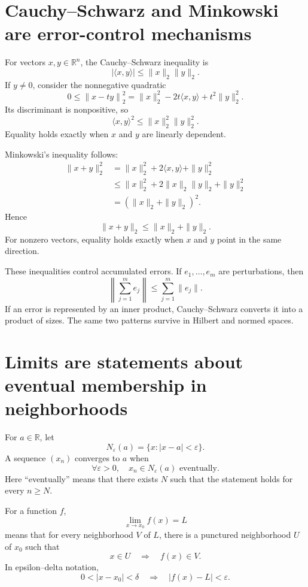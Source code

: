 
\section{Cauchy--Schwarz and Minkowski are error-control mechanisms}

For vectors \(x,y\in\mathbb R^n\), the Cauchy--Schwarz inequality is
\[
  |\langle x,y\rangle|
  \le \|x\|_2\|y\|_2.
\]
If \(y\ne0\), consider the nonnegative quadratic
\[
  0\le
  \left\|x-t y\right\|_2^2
  =\|x\|_2^2-2t\langle x,y\rangle+t^2\|y\|_2^2.
\]
Its discriminant is nonpositive, so
\[
  \langle x,y\rangle^2
  \le \|x\|_2^2\|y\|_2^2.
\]
Equality holds exactly when \(x\) and \(y\) are linearly dependent.

Minkowski's inequality follows:
\[
\begin{aligned}
  \|x+y\|_2^2
  &=\|x\|_2^2+2\langle x,y\rangle+\|y\|_2^2\\
  &\le\|x\|_2^2+2\|x\|_2\|y\|_2+\|y\|_2^2\\
  &=(\|x\|_2+\|y\|_2)^2.
\end{aligned}
\]
Hence
\[
  \boxed{\|x+y\|_2\le\|x\|_2+\|y\|_2.}
\]
For nonzero vectors, equality holds exactly when \(x\) and \(y\) point in the same direction.

These inequalities control accumulated errors.  If \(e_1,\ldots,e_m\) are perturbations, then
\[
  \left\|\sum_{j=1}^m e_j\right\|
  \le\sum_{j=1}^m\|e_j\|.
\]
If an error is represented by an inner product, Cauchy--Schwarz converts it into a product of sizes.  The same two patterns survive in Hilbert and normed spaces.

\section{Limits are statements about eventual membership in neighborhoods}

For \(a\in\mathbb R\), let
\[
  N_\varepsilon(a)=\{x:|x-a|<\varepsilon\}.
\]
A sequence \((x_n)\) converges to \(a\) when
\[
  \forall\varepsilon>0,
  \quad
  x_n\in N_\varepsilon(a)
  \text{ eventually}.
\]
Here ``eventually'' means that there exists \(N\) such that the statement holds for every \(n\ge N\).

For a function \(f\),
\[
  \lim_{x\to x_0}f(x)=L
\]
means that for every neighborhood \(V\) of \(L\), there is a punctured neighborhood \(U\) of \(x_0\) such that
\[
  x\in U\quad\Longrightarrow\quad f(x)\in V.
\]
In epsilon--delta notation,
\[
  0<|x-x_0|<\delta
  \quad\Longrightarrow\quad
  |f(x)-L|<\varepsilon.
\]

